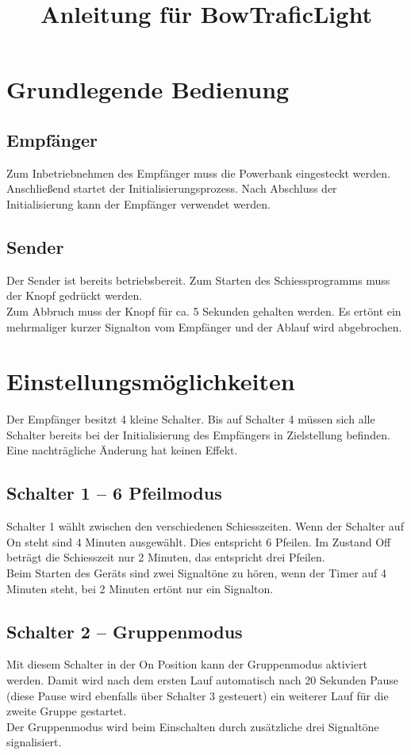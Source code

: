 \documentclass[12pt,a4paper,final]{article}
\title{Anleitung für BowTraficLight}
\date{\vspace{-10ex}}
\begin{document}
\maketitle
\section{Grundlegende Bedienung}
\subsection{Empfänger}
Zum Inbetriebnehmen des Empfänger muss die Powerbank eingesteckt werden. Anschließend startet der Initialisierungsprozess. Nach Abschluss der Initialisierung kann der Empfänger verwendet werden.
\subsection{Sender}
Der Sender ist bereits betriebsbereit. Zum Starten des Schiessprogramms muss der Knopf gedrückt werden.\\
Zum Abbruch muss der Knopf für ca. 5 Sekunden gehalten werden. Es ertönt ein mehrmaliger kurzer Signalton vom Empfänger und der Ablauf wird abgebrochen.
\section{Einstellungsmöglichkeiten}
Der Empfänger besitzt 4 kleine Schalter. Bis auf Schalter 4 müssen sich alle Schalter bereits bei der Initialisierung des Empfängers in Zielstellung befinden. Eine nachträgliche Änderung hat keinen Effekt.
\subsection{Schalter 1 -- 6 Pfeilmodus}
Schalter 1 wählt zwischen den verschiedenen Schiesszeiten. Wenn der Schalter auf On steht sind 4 Minuten ausgewählt. Dies entspricht 6 Pfeilen. Im Zustand Off beträgt die Schiesszeit nur 2 Minuten, das entspricht drei Pfeilen.\\
Beim Starten des Geräts sind zwei Signaltöne zu hören, wenn der Timer auf 4 Minuten steht, bei 2 Minuten ertönt nur ein Signalton.
\subsection{Schalter 2 -- Gruppenmodus}
Mit diesem Schalter in der On Position kann der Gruppenmodus aktiviert werden. Damit wird nach dem ersten Lauf automatisch nach 20 Sekunden Pause (diese Pause wird ebenfalls über Schalter 3 gesteuert) ein weiterer Lauf für die zweite Gruppe gestartet.\\
Der Gruppenmodus wird beim Einschalten durch zusätzliche drei Signaltöne signalisiert.
\end{document}
